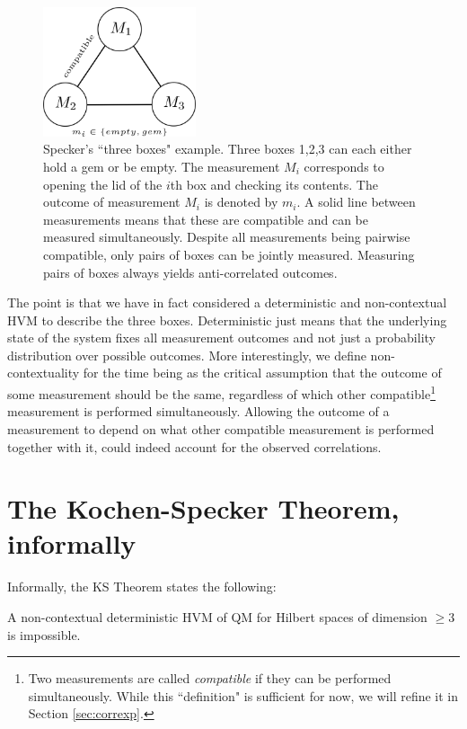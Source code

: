 \begin{figure}
\centering
\includegraphics[width=0.4\textwidth]{images/3boxes.png}
\caption{Specker's ``three boxes" example. Three boxes 1,2,3 can each either hold a gem or be empty. The measurement $M_i$ corresponds to opening the lid of the $i$th box and checking its contents. The outcome of measurement $M_i$ is denoted by $m_i$. A solid line between measurements means that these are compatible and can be measured simultaneously. Despite all measurements being pairwise compatible, only pairs of boxes can be jointly measured. Measuring pairs of boxes always yields anti-correlated outcomes.}
\label{fig:3boxes}
\end{figure}

The point is that we have in fact considered a deterministic and non-contextual HVM to describe the three boxes. Deterministic just means that the underlying state of the system fixes all measurement outcomes and not just a probability distribution over possible outcomes. More interestingly, we define non-contextuality for the time being as the critical assumption that the outcome of some measurement should be the same, regardless of which other compatible\footnote{Two measurements are called \emph{compatible} if they can be performed simultaneously. While this ``definition" is sufficient for now, we will refine it in Section \ref{sec:correxp}.} measurement is performed simultaneously. Allowing the outcome of a measurement to depend on what other compatible measurement is performed together with it, could indeed account for the observed correlations.

\section{The Kochen-Specker Theorem, informally}
Informally, the KS Theorem states the following:

\begin{theorem}
A non-contextual deterministic HVM of QM for Hilbert spaces of dimension $\geq3$ is impossible.
\end{theorem}

